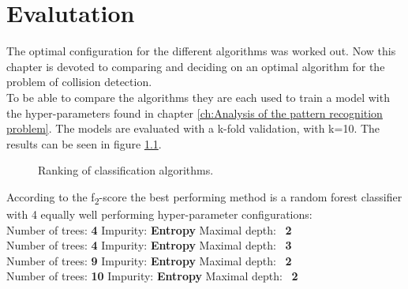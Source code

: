 \chapter{Evalutation}
\label{ch:Evalutation}
The optimal configuration for the different algorithms was worked out. Now this chapter is devoted to comparing and deciding on an optimal algorithm for the problem of collision detection.\\
To be able to compare the algorithms they are each used to train a model with the hyper-parameters found in chapter \ref{ch:Analysis of the pattern recognition problem}. The models are evaluated with a k-fold validation, with k=10. The results can be seen in figure \ref{fig:ranking}.


\begin{figure}[h]
\centering
{}

\caption{Ranking of classification algorithms.}
\label{fig:ranking}
\end{figure}

According to the  f\textsubscript{2}-score the best performing method is a random forest classifier with 4 equally well performing hyper-parameter configurations:\\

Number of trees: \textbf{4}  \qquad 
Impurity:  \textbf{Entropy}  \qquad 
Maximal depth: \ \textbf{2}  \qquad 
\\
Number of trees: \textbf{4}  \qquad 
Impurity:  \textbf{Entropy}  \qquad 
Maximal depth: \ \textbf{3}  \qquad
\\
Number of trees: \textbf{9}  \qquad 
Impurity:  \textbf{Entropy}  \qquad 
Maximal depth: \ \textbf{2}  \qquad
\\
Number of trees: \textbf{10}  \qquad 
Impurity:  \textbf{Entropy}  \qquad 
Maximal depth: \ \textbf{2}  \qquad
\\ 


